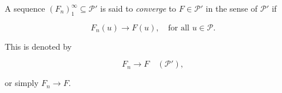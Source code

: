 A sequence $(F_n)_{1}^{\infty} \subseteq \mathcal{P}'$ is said to \textit{converge} to $F \in \mathcal{P}'$ in the sense of $\mathcal{P}'$ if

$$F_n(u) \to F(u), \quad \text{for all } u \in \mathcal{P}.$$

This is denoted by

$$F_n \to F \quad (\mathcal{P}'),$$

or simply $F_n \to F$.

